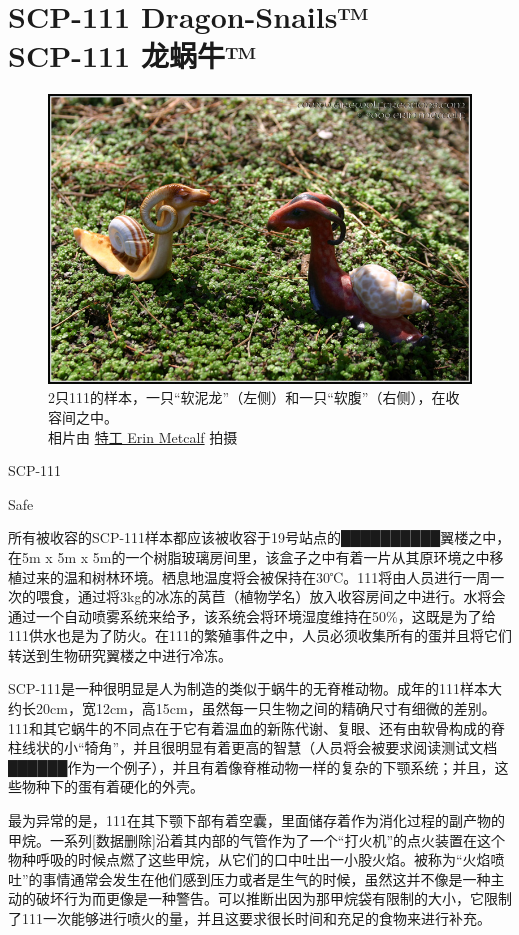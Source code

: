 \chapter[SCP-111 龙蜗牛™]{
    SCP-111 Dragon-Snails™\\
    SCP-111 龙蜗牛™
}

\label{chap:SCP-111}

\begin{figure}[H]
    \centering
    \includegraphics[width=0.5\linewidth]{images/SCP-111.jpg}
    \caption*{2只111的样本，一只“软泥龙”（左侧）和一只“软腹”（右侧），在收容间之中。\\相片由 \href{http://eirewolfcreations.deviantart.com/}{特工 Erin Metcalf} 拍摄}
\end{figure}

SCP-111

Safe

所有被收容的SCP-111样本都应该被收容于19号站点的██████████翼楼之中，在5m x 5m x 5m的一个树脂玻璃房间里，该盒子之中有着一片从其原环境之中移植过来的温和树林环境。栖息地温度将会被保持在30℃。111将由人员进行一周一次的喂食，通过将3kg的冰冻的莴苣（植物学名）放入收容房间之中进行。水将会通过一个自动喷雾系统来给予，该系统会将环境湿度维持在50\%，这既是为了给111供水也是为了防火。在111的繁殖事件之中，人员必须收集所有的蛋并且将它们转送到生物研究翼楼之中进行冷冻。

SCP-111是一种很明显是人为制造的类似于蜗牛的无脊椎动物。成年的111样本大约长20cm，宽12cm，高15cm，虽然每一只生物之间的精确尺寸有细微的差别。111和其它蜗牛的不同点在于它有着温血的新陈代谢、复眼、还有由软骨构成的脊柱线状的小“犄角”，并且很明显有着更高的智慧（人员将会被要求阅读测试文档██████作为一个例子），并且有着像脊椎动物一样的复杂的下颚系统；并且，这些物种下的蛋有着硬化的外壳。

最为异常的是，111在其下颚下部有着空囊，里面储存着作为消化过程的副产物的甲烷。一系列{[}数据删除]沿着其内部的气管作为了一个“打火机”的点火装置在这个物种呼吸的时候点燃了这些甲烷，从它们的口中吐出一小股火焰。被称为“火焰喷吐”的事情通常会发生在他们感到压力或者是生气的时候，虽然这并不像是一种主动的破坏行为而更像是一种警告。可以推断出因为那甲烷袋有限制的大小，它限制了111一次能够进行喷火的量，并且这要求很长时间和充足的食物来进行补充。

